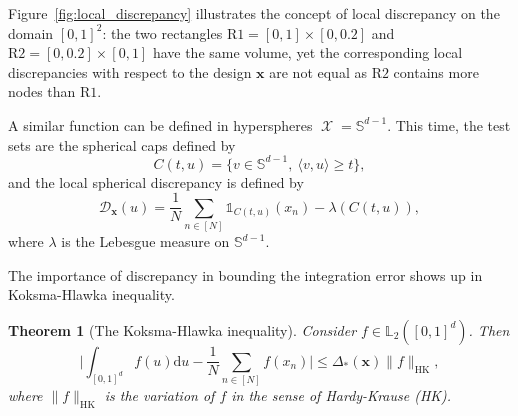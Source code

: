 \documentclass[twoside,11pt]{book}
\newtheorem{theorem}{Theorem}
\numberwithin{theorem}{chapter}
\numberwithin{definition}{chapter}
\numberwithin{proposition}{chapter}
\numberwithin{corollary}{chapter}
\numberwithin{example}{chapter}
\numberwithin{lemma}{chapter}
\numberwithin{assumption}{chapter}
\DeclareMathOperator{\X}{\mathcal{X}}
\begin{document}
Figure~\ref{fig:local_discrepancy} illustrates the concept of local discrepancy on the domain $[0,1]^{2}$: the two rectangles $\mathrm{R1} = [0,1] \times [0,0.2]$ and $\mathrm{R2} = [0,0.2] \times [0,1]$ have the same volume, yet the corresponding local discrepancies with respect to the design $\bm{x}$ are not equal as $\mathrm{R2}$ contains more nodes than $\mathrm{R1}$.

A similar function can be defined in hyperspheres $\X = \mathbb{S}^{d-1}$. This time, the test sets are the spherical caps defined by
\begin{equation}
C(t,u) = \{ v \in \mathbb{S}^{d-1}, \: \langle v, u \rangle \geq t\},
\end{equation}
and the local spherical discrepancy is defined by
\begin{equation}
\mathcal{D}_{\bm{x}}(u) = \frac{1}{N}\sum\limits_{n \in [N]} \mathbb{1}_{C(t,u)}(x_n) - \lambda(C(t,u)),
\end{equation}
where $\lambda$ is the Lebesgue measure on $\mathbb{S}^{d-1}$.


The importance of discrepancy in bounding the integration error shows up in Koksma-Hlawka inequality.


\begin{theorem}[The Koksma-Hlawka inequality]\label{thm:KH_ineq}
Consider $f \in \mathbb{L}_{2}([0,1]^{d})$. Then 
\begin{equation}\label{eq:KH_ineq}
\bigg| \int_{[0,1]^{d}} f(u) \mathrm{d}u - \frac{1}{N} \sum\limits_{n \in [N]}  f(x_{n})\bigg| \leq \Delta_{*}(\bm{x}) \|f\|_{\mathrm{HK}},
\end{equation}
where $\|f\|_{\mathrm{HK}}$ is the variation of $f$ in the sense of Hardy-Krause (HK). 


\end{theorem}
\end{document}

